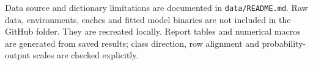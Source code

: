Data source and dictionary limitations are documented in \texttt{data/README.md}. Raw data, environments, caches and fitted model binaries are not included in the GitHub folder. They are recreated locally. Report tables and numerical macros are generated from saved results; class direction, row alignment and probability-output scales are checked explicitly.
